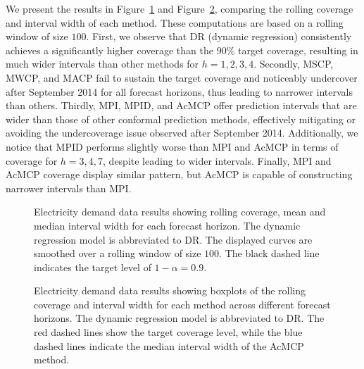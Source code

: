 \documentclass[
  11pt,
  a4paper,
]{article}
\theoremstyle{plain}
\theoremstyle{plain}
\theoremstyle{remark}
\begin{document}
We present the results in Figure~\ref{fig-elec_cov} and
Figure~\ref{fig-elec_box}, comparing the rolling coverage and interval
width of each method. These computations are based on a rolling window
of size \(100\). First, we observe that DR (dynamic regression)
consistently achieves a significantly higher coverage than the \(90\%\)
target coverage, resulting in much wider intervals than other methods
for \(h=1,2,3,4\). Secondly, MSCP, MWCP, and MACP fail to sustain the
target coverage and noticeably undercover after September 2014 for all
forecast horizons, thus leading to narrower intervals than others.
Thirdly, MPI, MPID, and AcMCP offer prediction intervals that are wider
than those of other conformal prediction methods, effectively mitigating
or avoiding the undercoverage issue observed after September 2014.
Additionally, we notice that MPID performs slightly worse than MPI and
AcMCP in terms of coverage for \(h=3,4,7\), despite leading to wider
intervals. Finally, MPI and AcMCP coverage display similar pattern, but
AcMCP is capable of constructing narrower intervals than MPI.

\begin{figure}


\caption{\label{fig-elec_cov}Electricity demand data results showing
rolling coverage, mean and median interval width for each forecast
horizon. The dynamic regression model is abbreviated to DR. The
displayed curves are smoothed over a rolling window of size \(100\). The
black dashed line indicates the target level of \(1-\alpha=0.9\).}

\end{figure}%

\begin{figure}


\caption{\label{fig-elec_box}Electricity demand data results showing
boxplots of the rolling coverage and interval width for each method
across different forecast horizons. The dynamic regression model is
abbreviated to DR. The red dashed lines show the target coverage level,
while the blue dashed lines indicate the median interval width of the
AcMCP method.}

\end{figure}%
\end{document}

